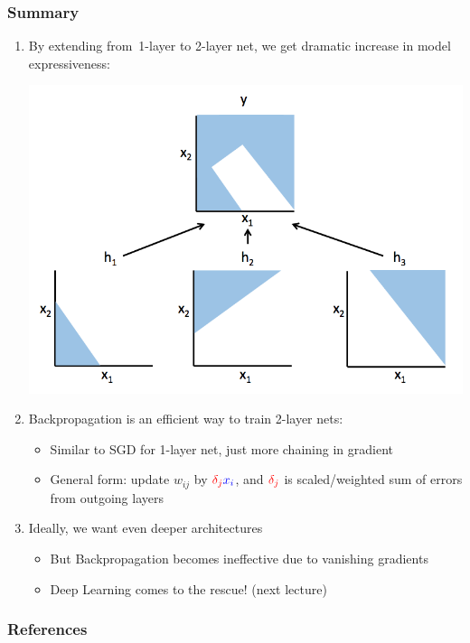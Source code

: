\documentclass{beamer}
\newcommand{\bi}{\begin{itemize}}
\newcommand{\ei}{\end{itemize}}
\newcommand{\be}{\begin{enumerate}}
\newcommand{\ee}{\end{enumerate}}
\begin{document}
\begin{frame}
\frametitle{Summary}
\be
\item By extending from~1-layer to 2-layer net, we get dramatic increase in model expressiveness:
\centerline{\includegraphics[scale=0.2]{figs/twolayer_nonlinearity}}
\pause
\item Backpropagation is an efficient way to train 2-layer nets:
\bi
	\item Similar to SGD for 1-layer net, just more chaining in gradient
	\pause
	\item General form: update $w_{ij}$ by ${\color{red} \delta_j} {\color{blue} x_i}$, and ${\color{red} \delta_j}$ is scaled/weighted sum of errors from outgoing layers
\ei
\pause
\item Ideally, we want even deeper architectures
\bi
	\pause
	\item But Backpropagation becomes ineffective due to vanishing gradients 
	\item Deep Learning comes to the rescue! (next lecture)
\ei
\ee
\end{frame}










\begin{frame}[allowframebreaks]
\frametitle{References}


\end{frame}
\end{document}
